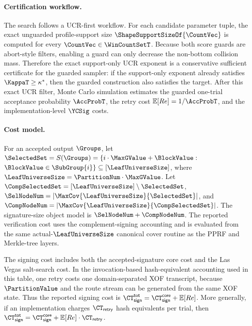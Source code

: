 \paragraph{Certification workflow.}
The search follows a UCR-first workflow. For each candidate parameter tuple,
the exact unguarded profile-support size $\ShapeSupportSizeOf{\CountVec}$ is
computed for every $\CountVec\in\WinCountSetT$. Because both score guards are
abort-style filters, enabling a guard can only decrease the non-bottom
collision mass. Therefore the exact support-only UCR exponent is a
conservative sufficient certificate for the guarded sampler: if the
support-only exponent already satisfies $\KappaT\ge\kappa^{*}$, then the
guarded construction also satisfies the target. After this exact UCR filter,
Monte Carlo simulation estimates the guarded one-trial acceptance probability
$\AccProbT$, the retry cost $\mathbb E[Re]=1/\AccProbT$, and the
implementation-level $\YCSig$ costs.

\paragraph{Cost model.}
For an accepted output $\Groups$, let
$\SelectedSet=S(\Groups)=\{i\cdot\MaxGValue+\BlockValue:$
$\BlockValue\in\SubGroup{i}\}\subseteq[\LeafUniverseSize]$, where
$\LeafUniverseSize=\PartitionNum\cdot\MaxGValue$. Let
$\CompSelectedSet=[\LeafUniverseSize]\setminus\SelectedSet$,
$\SelNodeNum=|\MaxCov{\LeafUniverseSize}{\SelectedSet}|$, and
$\CompNodeNum=|\MaxCov{\LeafUniverseSize}{\CompSelectedSet}|$. The
signature-size object model is $\SelNodeNum+\CompNodeNum$. The reported
verification cost uses the complement-signing accounting and is evaluated from
the same actual-$\LeafUniverseSize$ canonical cover routine as the PPRF and
Merkle-tree layers.

The signing cost includes both the accepted-signature core cost and the
Las Vegas salt-search cost. In the invocation-based hash-equivalent accounting
used in this table, one retry costs one domain-separated XOF transcript,
because $\PartitionValue$ and the route stream can be generated from the same
XOF state. Thus the reported signing cost is
$\CT_{\mathsf{sign}}^{\mathsf{tot}}
=\CT_{\mathsf{sign}}^{\mathsf{core}}+\mathbb E[Re]$. More generally, if an
implementation charges $\CT_{\mathsf{retry}}$ hash equivalents per trial, then
$\CT_{\mathsf{sign}}^{\mathsf{tot}}
=\CT_{\mathsf{sign}}^{\mathsf{core}}
+\mathbb E[Re]\cdot\CT_{\mathsf{retry}}$.

